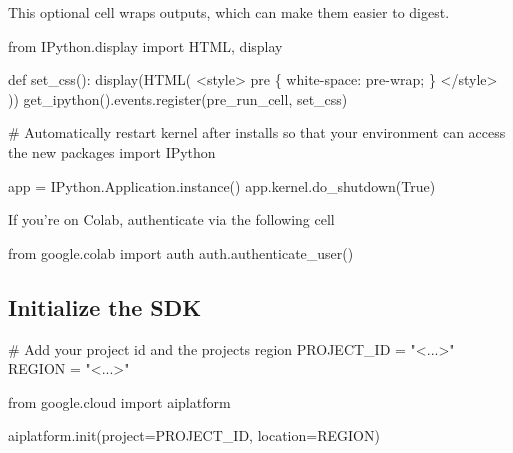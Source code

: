\documentclass[
  letterpaper,
  DIV=11,
  numbers=noendperiod]{scrreprt}
\newenvironment{Shaded}{\begin{snugshade}}{\end{snugshade}}
\newcommand{\CommentTok}[1]{\textcolor[rgb]{0.37,0.37,0.37}{#1}}
\newcommand{\ImportTok}[1]{\textcolor[rgb]{0.00,0.46,0.62}{#1}}
\newcommand{\KeywordTok}[1]{\textcolor[rgb]{0.00,0.23,0.31}{#1}}
\newcommand{\NormalTok}[1]{\textcolor[rgb]{0.00,0.23,0.31}{#1}}
\newcommand{\OperatorTok}[1]{\textcolor[rgb]{0.37,0.37,0.37}{#1}}
\newcommand{\StringTok}[1]{\textcolor[rgb]{0.13,0.47,0.30}{#1}}
\newcommand{\VariableTok}[1]{\textcolor[rgb]{0.07,0.07,0.07}{#1}}
\begin{document}
This optional cell wraps outputs, which can make them easier to digest.

\begin{Shaded}
\begin{Highlighting}[]
\ImportTok{from}\NormalTok{ IPython.display }\ImportTok{import}\NormalTok{ HTML, display}

\KeywordTok{def}\NormalTok{ set\_css():}
\NormalTok{  display(HTML(}\StringTok{\textquotesingle{}\textquotesingle{}\textquotesingle{}}
\StringTok{  \textless{}style\textgreater{}}
\StringTok{    pre \{}
\StringTok{        white{-}space: pre{-}wrap;}
\StringTok{    \}}
\StringTok{  \textless{}/style\textgreater{}}
\StringTok{  \textquotesingle{}\textquotesingle{}\textquotesingle{}}\NormalTok{))}
\NormalTok{get\_ipython().events.register(}\StringTok{\textquotesingle{}pre\_run\_cell\textquotesingle{}}\NormalTok{, set\_css)}
\end{Highlighting}
\end{Shaded}

\begin{Shaded}
\begin{Highlighting}[]
\CommentTok{\# Automatically restart kernel after installs so that your environment can access the new packages}
\ImportTok{import}\NormalTok{ IPython}

\NormalTok{app }\OperatorTok{=}\NormalTok{ IPython.Application.instance()}
\NormalTok{app.kernel.do\_shutdown(}\VariableTok{True}\NormalTok{)}
\end{Highlighting}
\end{Shaded}

If you're on Colab, authenticate via the following cell

\begin{Shaded}
\begin{Highlighting}[]
\ImportTok{from}\NormalTok{ google.colab }\ImportTok{import}\NormalTok{ auth}
\NormalTok{auth.authenticate\_user()}
\end{Highlighting}
\end{Shaded}

\hypertarget{initialize-the-sdk}{%
\subsection{Initialize the SDK}\label{initialize-the-sdk}}

\begin{Shaded}
\begin{Highlighting}[]
\CommentTok{\# Add your project id and the project\textquotesingle{}s region}
\NormalTok{PROJECT\_ID }\OperatorTok{=} \StringTok{"\textless{}...\textgreater{}"}
\NormalTok{REGION }\OperatorTok{=} \StringTok{"\textless{}...\textgreater{}"}

\ImportTok{from}\NormalTok{ google.cloud }\ImportTok{import}\NormalTok{ aiplatform}

\NormalTok{aiplatform.init(project}\OperatorTok{=}\NormalTok{PROJECT\_ID, location}\OperatorTok{=}\NormalTok{REGION)}
\end{Highlighting}
\end{Shaded}
\end{document}

